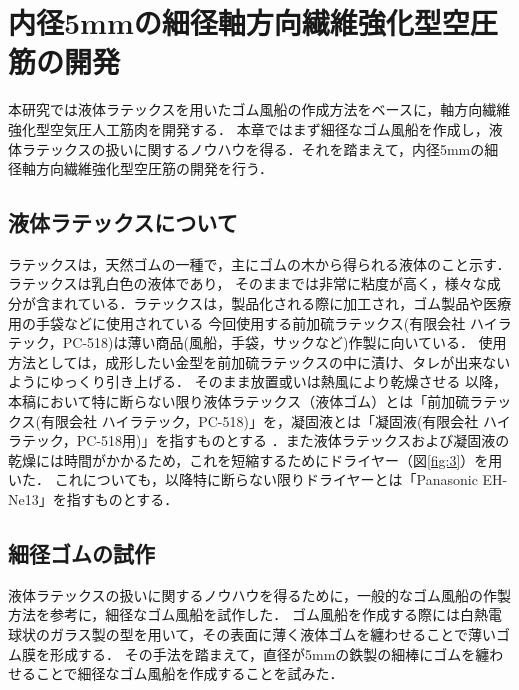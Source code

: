 \newpage
\section{内径5mmの細径軸方向繊維強化型空圧筋の開発}
本研究では液体ラテックスを用いたゴム風船の作成方法をベースに，軸方向繊維強化型空気圧人工筋肉を開発する．
本章ではまず細径なゴム風船を作成し，液体ラテックスの扱いに関するノウハウを得る．それを踏まえて，内径5mmの細径軸方向繊維強化型空圧筋の開発を行う．
\subsection{液体ラテックスについて}
ラテックスは，天然ゴムの一種で，主にゴムの木から得られる液体のこと示す．ラテックスは乳白色の液体であり，
そのままでは非常に粘度が高く，様々な成分が含まれている．ラテックスは，製品化される際に加工され，ゴム製品や医療用の手袋などに使用されている
今回使用する前加硫ラテックス(有限会社 ハイラテック，PC-518)は薄い商品(風船，手袋，サックなど)作製に向いている．
使用方法としては，成形したい金型を前加硫ラテックスの中に漬け、タレが出来ないようにゆっくり引き上げる．
そのまま放置或いは熱風により乾燥させる
以降，本稿において特に断らない限り液体ラテックス（液体ゴム）とは「前加硫ラテックス(有限会社 ハイラテック，PC-518)」を，凝固液とは「凝固液(有限会社 ハイラテック，PC-518用)」を指すものとする
．また液体ラテックスおよび凝固液の乾燥には時間がかかるため，これを短縮するためにドライヤー（図\ref{fig:3}）を用いた．
これについても，以降特に断らない限りドライヤーとは「Panasonic EH-Ne13」を指すものとする．
\subsection{細径ゴムの試作}
液体ラテックスの扱いに関するノウハウを得るために，一般的なゴム風船の作製方法\cite{91}を参考に，細径なゴム風船を試作した．
ゴム風船を作成する際には白熱電球状のガラス製の型を用いて，その表面に薄く液体ゴムを纏わせることで薄いゴム膜を形成する．
その手法を踏まえて，直径が5mmの鉄製の細棒にゴムを纏わせることで細径なゴム風船を作成することを試みた．
